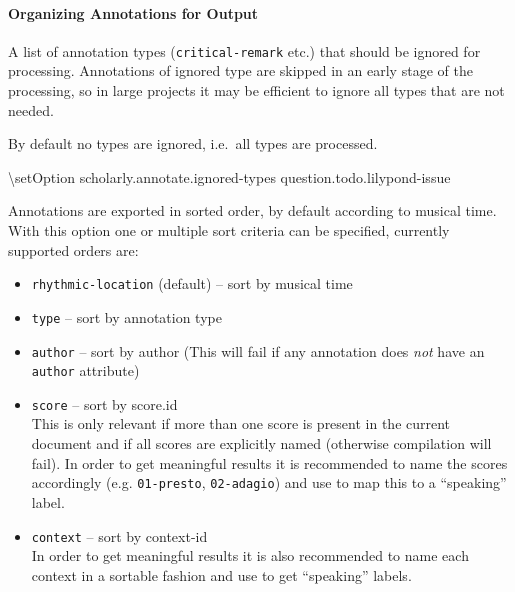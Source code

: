 \documentclass[]{ollmanual}
\newenvironment{Shaded}{}{}
\newcommand{\FunctionTok}[1]{\textcolor[rgb]{0.02,0.16,0.49}{#1}}
\newcommand{\NormalTok}[1]{#1}
\providecommand{\tightlist}{%
  \setlength{\itemsep}{0pt}\setlength{\parskip}{0pt}}
\let\oldparagraph\paragraph
\renewcommand{\paragraph}[1]{\oldparagraph{#1}\mbox{}}
\begin{document}
\hypertarget{organizing-annotations-for-output}{%
\paragraph{Organizing Annotations for
Output}\label{organizing-annotations-for-output}}


A list of annotation types (\texttt{critical-remark} etc.) that should
be ignored for processing. Annotations of ignored type are skipped in an
early stage of the processing, so in large projects it may be efficient
to ignore all types that are not needed.

By default no types are ignored, i.e.~all types are processed.

\begin{Shaded}
\begin{Highlighting}[]
\FunctionTok{\textbackslash{}setOption}\NormalTok{ scholarly.annotate.ignored-types question.todo.lilypond-issue}
\end{Highlighting}
\end{Shaded}


Annotations are exported in sorted order, by default according to
musical time. With this option one or multiple sort criteria can be
specified, currently supported orders are:

\begin{itemize}
\tightlist
\item
  \texttt{rhythmic-location} (default) -- sort by musical time
\item
  \texttt{type} -- sort by annotation type
\item
  \texttt{author} -- sort by author (This will fail if any annotation
  does \emph{not} have an \texttt{author} attribute)
\item
  \texttt{score} -- sort by score.id\\
  This is only relevant if more than one score is present in the current
  document and if all scores are explicitly named (otherwise compilation
  will fail). In order to get meaningful results it is recommended to
  name the scores accordingly (e.g. \texttt{01-presto},
  \texttt{02-adagio}) and use  to map this to
  a ``speaking'' label.
\item
  \texttt{context} -- sort by context-id\\
  In order to get meaningful results it is also recommended to name each
  context in a sortable fashion and use  to
  get ``speaking'' labels.
\end{itemize}
\end{document}
